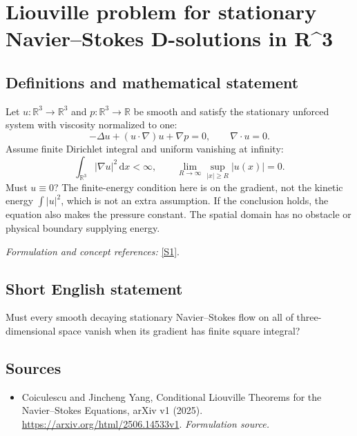 \documentclass[11pt]{article}
\begin{document}
\section*{\texorpdfstring{Liouville problem for stationary Navier–Stokes D-solutions in R\textasciicircum{}3}{Liouville problem for stationary Navier–Stokes D-solutions in R\textasciicircum{}3}}\label{487}
\subsection{Definitions and mathematical statement}
Let $u:{\mathbb{R}}^3\to{\mathbb{R}}^3$ and $p:{\mathbb{R}}^3\to{\mathbb{R}}$ be smooth and satisfy the stationary unforced system with viscosity normalized to one:
\[
 -\Delta u+(u\cdot\nabla)u+\nabla p=0,
 \qquad\nabla\cdot u=0.
\]
Assume finite Dirichlet integral and uniform vanishing at infinity:
\[
 \int_{{\mathbb{R}}^3}|\nabla u|^2{\,\mathrm{d}} x<\infty,
 \qquad \lim_{R\to\infty}\sup_{|x|\ge R}|u(x)|=0.
\]
Must $u\equiv0$? The finite-energy condition here is on the gradient, not the kinetic energy $\int|u|^2$, which is not an extra assumption. If the conclusion holds, the equation also makes the pressure constant. The spatial domain has no obstacle or physical boundary supplying energy.
\par\smallskip\textit{Formulation and concept references:} \href{https://arxiv.org/html/2506.14533v1}{[S1]}.

\subsection{Short English statement}
Must every smooth decaying stationary Navier--Stokes flow on all of three-dimensional space vanish when its gradient has finite square integral?
\subsection{Sources}
\begin{itemize}
\item[S1]Coiculescu and Jincheng Yang, Conditional Liouville Theorems for the Navier–Stokes Equations, arXiv v1 (2025).
\url{https://arxiv.org/html/2506.14533v1}.
\textit{Formulation source.}
\end{itemize}
\end{document}
